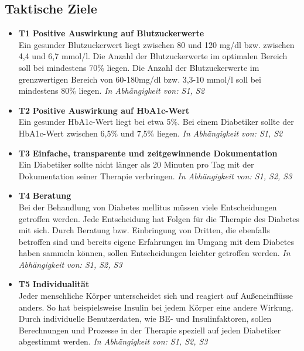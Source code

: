 \subsection{Taktische Ziele}
\begin{itemize}
	\item \lbrack \textbf{T1}\rbrack \textbf{ Positive Auswirkung auf Blutzuckerwerte} \\
	Ein gesunder Blutzuckerwert liegt zwischen 80 und 120 mg/dl bzw. zwischen 4,4 und 6,7 mmol/l. Die Anzahl der Blutzuckerwerte im optimalen Bereich soll bei mindestens 70\% liegen. Die Anzahl der Blutzuckerwerte im grenzwertigen Bereich von 60-180mg/dl bzw. 3,3-10 mmol/l soll bei mindestens 80\% liegen.\newline
	\emph{In Abhängigkeit von: S1, S2} 
	\item \lbrack \textbf{T2}\rbrack \textbf{ Positive Auswirkung auf HbA1c-Wert} \\
	Ein gesunder HbA1c-Wert liegt bei etwa 5\%. Bei einem Diabetiker sollte der HbA1c-Wert zwischen 6,5\% und 7,5\% liegen. \newline
	\emph{In Abhängigkeit von: S1, S2} 
	\item \lbrack \textbf{T3}\rbrack \textbf{ Einfache, transparente und zeitgewinnende Dokumentation} \\
	Ein Diabetiker sollte nicht länger als 20 Minuten pro Tag mit der Dokumentation seiner Therapie verbringen.\newline
	\emph{In Abhängigkeit von: S1, S2, S3} 
	\item \lbrack \textbf{T4}\rbrack \textbf{ Beratung} \\
	Bei der Behandlung von Diabetes mellitus müssen viele Entscheidungen getroffen werden. Jede Entscheidung hat Folgen für die Therapie des Diabetes mit sich. Durch Beratung bzw. Einbringung von Dritten, die ebenfalls betroffen sind und bereits eigene Erfahrungen im Umgang mit dem Diabetes haben sammeln können, sollen Entscheidungen leichter getroffen werden. \newline
	\emph{In Abhängigkeit von: S1, S2, S3} 
	\item \lbrack \textbf{T5}\rbrack \textbf{ Individualität} \\ 
	Jeder menschliche Körper unterscheidet sich und reagiert auf Außeneinflüsse anders. So hat beispielsweise Insulin bei jedem Körper eine andere Wirkung. Durch individuelle Benutzerdaten, wie BE- und Insulinfaktoren, sollen Berechnungen und Prozesse in der Therapie speziell auf jeden Diabetiker abgestimmt werden. \newline
	\emph{In Abhängigkeit von: S1, S2, S3} 
\end{itemize}

